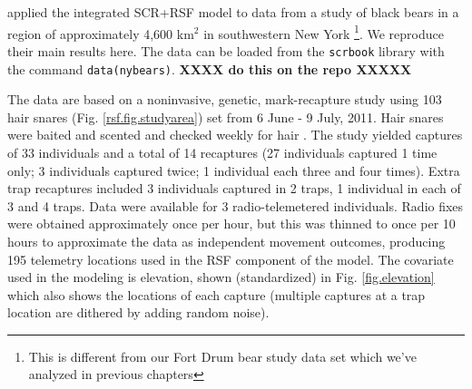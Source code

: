 \citet{royle_etal:2012mee} applied the integrated SCR+RSF model to
data from a study of black bears in a region of approximately 4,600
km$^2$ in southwestern New York \citep{sun:2013}\footnote{This is
different from our Fort Drum bear study data set which we've analyzed
in previous chapters}. We reproduce their
main results here.  The data can be loaded from the \mbox{\tt scrbook}
library with the command \mbox{\tt data(nybears)}. {\bf XXXX do this
  on the repo XXXXX} 

The data are based on a noninvasive, genetic, mark-recapture study
using 103 hair snares (Fig. \ref{rsf.fig.studyarea}) set from 6 June -
9 July, 2011.  Hair snares were baited and scented and checked weekly
for hair \citep{sun:2013}.  The study yielded captures of 33
individuals and a total of 14 recaptures (27 individuals captured 1
time only; 3 individuals captured twice; 1 individual each three and
four times). Extra trap recaptures included 3 individuals captured in
2 traps, 1 individual in each of 3 and 4 traps.  Data were available
for 3 radio-telemetered individuals.  Radio fixes were obtained
approximately once per hour, but this was thinned to once per 10 hours
to approximate the data as independent movement outcomes, producing
195 telemetry locations used in the RSF component of the model.  The
covariate used in the modeling is elevation, shown (standardized) in
Fig. \ref{fig.elevation} which also shows the locations of each
capture (multiple captures at a trap location are dithered by adding
random noise).

